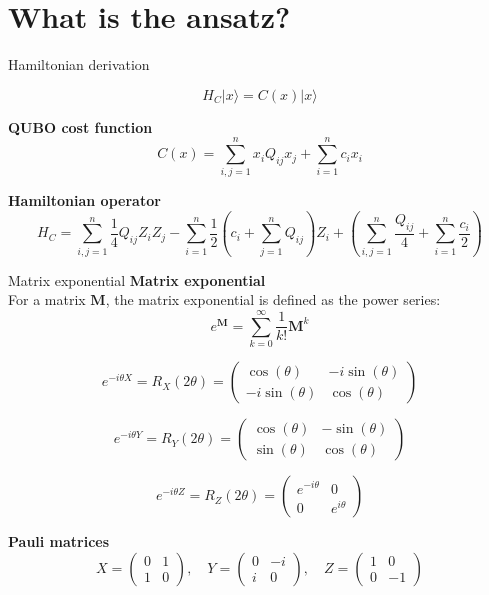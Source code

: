 \documentclass{beamer}
\begin{document}
\section{What is the ansatz?}
\begin{frame}{Hamiltonian derivation}
    
    \[
        H_C |x\rangle = C(x) |x\rangle
        \]
    
        \vspace{1cm}
        
        \textbf{QUBO cost function}
        \[
        C(x) = \sum_{i,j=1}^{n} x_i Q_{ij} x_j + \sum_{i=1}^{n} c_i x_i
        \]
    
        \vspace{1cm}
    
        \textbf{Hamiltonian operator}
        \[
        H_C = \sum_{i,j=1}^{n} \frac{1}{4} Q_{ij} Z_i Z_j - \sum_{i=1}^{n} \frac{1}{2} \left( c_i + \sum_{j=1}^{n} Q_{ij} \right) Z_i + \left( \sum_{i,j=1}^{n} \frac{Q_{ij}}{4} + \sum_{i=1}^{n} \frac{c_i}{2} \right)
        \] 
    
\end{frame}
\begin{frame}{Matrix exponential}
    \textbf{Matrix exponential} \\
    For a matrix $\mathbf{M}$, the matrix exponential is defined as the power series:
    \[
        e^{\mathbf{M}} = \sum_{k=0}^{\infty} \frac{1}{k!} \mathbf{M}^k
    \]
    
    \vspace{1cm}
    
    \[
        e^{-i \theta X} = R_X(2 \theta) = \begin{pmatrix} \cos(\theta) & -i \sin(\theta) \\ -i \sin(\theta) & \cos(\theta) \end{pmatrix}
    \]
    
    \[
        e^{-i \theta Y} = R_Y(2 \theta) = \begin{pmatrix} \cos(\theta) & -\sin(\theta) \\ \sin(\theta) & \cos(\theta) \end{pmatrix}
    \]
    
    \[
        e^{-i \theta Z} = R_Z(2 \theta) = \begin{pmatrix} e^{-i \theta} & 0 \\ 0 & e^{i \theta} \end{pmatrix}
    \]
    
    \vspace{1cm}
    
    \textbf{Pauli matrices}
    \[
        X = \begin{pmatrix} 0 & 1 \\ 1 & 0 \end{pmatrix}, \quad Y = \begin{pmatrix} 0 & -i \\ i & 0 \end{pmatrix}, \quad Z = \begin{pmatrix} 1 & 0 \\ 0 & -1 \end{pmatrix}
    \]
\end{frame}
\end{document}
